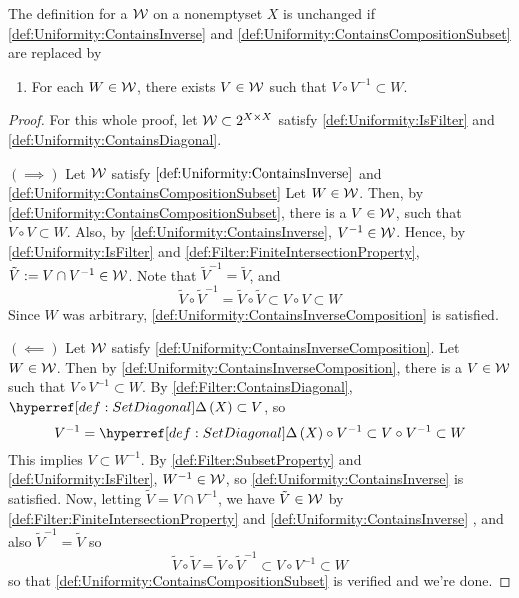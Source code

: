 \begin{prop}
\label{prop:UniformityCharacterization}
The definition for a \Uniformity $\mathcal{W}$ on a nonemptyset $X$ 
is unchanged if 
\ref{def:Uniformity:ContainsInverse} and 
\ref{def:Uniformity:ContainsCompositionSubset} are replaced by 
\begin{enumerate}[label=(\roman*), ref={\ref{prop:UniformityCharacterization}~\roman*}]
\item \label{def:Uniformity:ContainsInverseComposition} For each $W \in \mathcal{W}$, there exists $V \in \mathcal{W}$ such that $V \circ V^{-1} \subset W$. 
\end{enumerate}
\begin{proof}
For this whole proof, let $\mathcal{W} \subset 2^{X \times X}$ satisfy
\ref{def:Uniformity:IsFilter} and 
\ref{def:Uniformity:ContainsDiagonal}.

$(\implies)$ Let $\mathcal{W}$ satisfy $\ref{def:Uniformity:ContainsInverse}$ 
and \ref{def:Uniformity:ContainsCompositionSubset}
Let $W \in \mathcal{W}$.
Then, by \ref{def:Uniformity:ContainsCompositionSubset}, there is a $V \in \mathcal{W}$,
such that $V \circ V \subset W$. 
Also,  by \ref{def:Uniformity:ContainsInverse}, $V^{-1} \in \mathcal{W}$. 
Hence, by \ref{def:Uniformity:IsFilter} and \ref{def:Filter:FiniteIntersectionProperty}, 
$\tilde{V}:=V \cap V^{-1} \in \mathcal{W}$. 
Note that $\tilde{V}^{-1}=\tilde{V}$, and 
\begin{equation*}
\tilde{V} \circ \tilde{V}^{-1} = \tilde{V} \circ \tilde{V} \subset V \circ V \subset W
\end{equation*}
Since $W$ was arbitrary, \ref{def:Uniformity:ContainsInverseComposition} is satisfied. 

$(\impliedby)$ Let $\mathcal{W}$ satisfy \ref{def:Uniformity:ContainsInverseComposition}.
Let $W \in \mathcal{W}$. Then by \ref{def:Uniformity:ContainsInverseComposition}, there is a 
$V \in \mathcal{W}$ such that $V \circ V^{-1} \subset W$. 
By \ref{def:Filter:ContainsDiagonal}, $\scSetDiagonal{X} \subset V$, so 
\begin{equation*}
    V^{-1} = \scSetDiagonal{X} \circ V^{-1} \subset V \circ V^{-1} \subset W
\end{equation*}
This implies $V \subset W^{-1}$. By \ref{def:Filter:SubsetProperty} and \ref{def:Uniformity:IsFilter}, $W^{-1} \in \mathcal{W}$, so \ref{def:Uniformity:ContainsInverse} is satisfied. 
Now, letting 
$\tilde{V} = V \cap V^{-1}$, we have $\tilde{V} \in \mathcal{W}$ by 
\ref{def:Filter:FiniteIntersectionProperty} and \ref{def:Uniformity:ContainsInverse}
, and also $\tilde{V}^{-1} = \tilde{V}$ so 
\begin{equation*}
\tilde{V} \circ \tilde{V} = \tilde{V} \circ \tilde{V}^{-1} \subset V \circ V^{-1} \subset W
\end{equation*}
so that \ref{def:Uniformity:ContainsCompositionSubset} is verified and we're done. 



\end{proof}
\end{prop}

